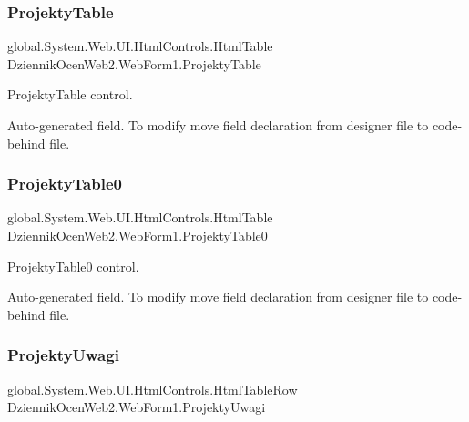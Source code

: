 \subsubsection{\texorpdfstring{Projekty\+Table}{ProjektyTable}}
{\footnotesize\ttfamily global.\+System.\+Web.\+U\+I.\+Html\+Controls.\+Html\+Table Dziennik\+Ocen\+Web2.\+Web\+Form1.\+Projekty\+Table\hspace{0.3cm}{\ttfamily [protected]}}



Projekty\+Table control. 

Auto-\/generated field. To modify move field declaration from designer file to code-\/behind file. \mbox{\label{class_dziennik_ocen_web2_1_1_web_form1_a218e50105cfbf5e9c4c218f1098e2e00}} 
\subsubsection{\texorpdfstring{Projekty\+Table0}{ProjektyTable0}}
{\footnotesize\ttfamily global.\+System.\+Web.\+U\+I.\+Html\+Controls.\+Html\+Table Dziennik\+Ocen\+Web2.\+Web\+Form1.\+Projekty\+Table0\hspace{0.3cm}{\ttfamily [protected]}}



Projekty\+Table0 control. 

Auto-\/generated field. To modify move field declaration from designer file to code-\/behind file. \mbox{\label{class_dziennik_ocen_web2_1_1_web_form1_a27e330c18393285c8f2e61279dee5106}} 
\subsubsection{\texorpdfstring{Projekty\+Uwagi}{ProjektyUwagi}}
{\footnotesize\ttfamily global.\+System.\+Web.\+U\+I.\+Html\+Controls.\+Html\+Table\+Row Dziennik\+Ocen\+Web2.\+Web\+Form1.\+Projekty\+Uwagi\hspace{0.3cm}{\ttfamily [protected]}}



